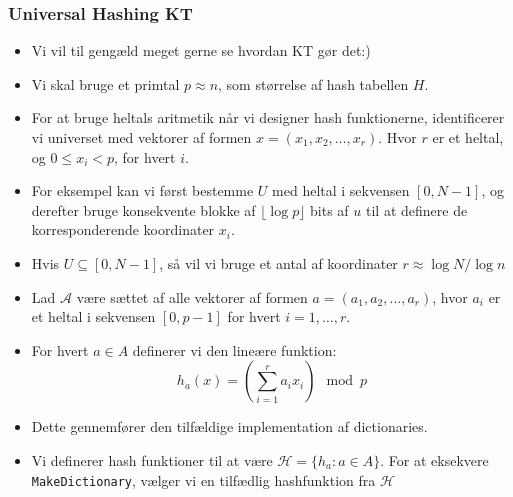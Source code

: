 \documentclass{beamer}
\begin{document}
\begin{frame}[allowframebreaks]
  \frametitle{Universal Hashing KT}
 \begin{itemize}
 \item Vi vil til gengæld meget gerne se hvordan KT gør det:)
 \item Vi skal bruge et primtal $p \approx n$, som størrelse af hash tabellen $H$.
 \item For at bruge heltals aritmetik når vi designer hash funktionerne, identificerer vi universet med vektorer af formen $x = (x_{1}, x_{2}, \ldots, x_{r})$. Hvor $r$ er et heltal, og $0 \leq x_{i} < p$, for hvert $i$.
 \item For eksempel kan vi først bestemme $U$ med heltal i sekvensen $[0, N-1]$, og derefter bruge konsekvente blokke af $\lfloor \log p \rfloor$ bits af $u$ til at definere de korresponderende koordinater $x_{i}$.
 \item Hvis $U \subseteq [0, N-1]$, så vil vi bruge et antal af koordinater $r \approx \log N / \log n$
 \item Lad $\mathcal{A}$ være sættet af alle vektorer af formen $a = (a_{1}, a_{2}, \ldots, a_{r})$, hvor $a_{i}$ er et heltal i sekvensen $[0, p-1]$ for hvert $i = 1, \ldots, r$. 
 \item For hvert $a \in A$ definerer vi den lineære funktion: \[ h_{a}(x) = \left( \sum_{i=1}^{r} a_{i}x_{i} \right) \mod p \]
 \item Dette gennemfører den tilfældige implementation af dictionaries.
 \item Vi definerer hash funktioner til at være $\mathcal{H} = \{h_{a} : a \in A\}$. For at eksekvere \texttt{MakeDictionary}, vælger vi en tilfædlig hashfunktion fra $\mathcal{H}$
 \end{itemize} 
\end{frame}
\end{document}
